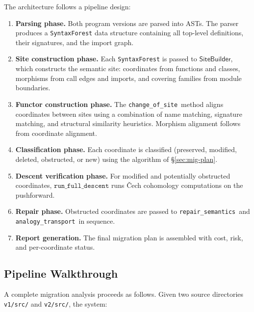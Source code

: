 \documentclass[11pt]{article}
\newcommand{\ChangeOfSite}{\texttt{change\_of\_site}}
\newcommand{\RunDescent}{\texttt{run\_full\_descent}}
\newcommand{\RepairSem}{\texttt{repair\_semantics}}
\newcommand{\AnalTrans}{\texttt{analogy\_transport}}
\begin{document}
The architecture follows a pipeline design:
\begin{enumerate}[noitemsep]
  \item \textbf{Parsing phase.} Both program versions are parsed into ASTs.
        The parser produces a \texttt{SyntaxForest} data structure containing
        all top-level definitions, their signatures, and the import graph.
  \item \textbf{Site construction phase.} Each \texttt{SyntaxForest} is
        passed to $\mathsf{SiteBuilder}$, which constructs the semantic
        site: coordinates from functions and classes, morphisms from call
        edges and imports, and covering families from module boundaries.
  \item \textbf{Functor construction phase.} The \ChangeOfSite\ method
        aligns coordinates between sites using a combination of name
        matching, signature matching, and structural similarity heuristics.
        Morphism alignment follows from coordinate alignment.
  \item \textbf{Classification phase.} Each coordinate is classified
        (preserved, modified, deleted, obstructed, or new) using the
        algorithm of §\ref{sec:mig-plan}.
  \item \textbf{Descent verification phase.} For modified and potentially
        obstructed coordinates, $\RunDescent$ runs \v{C}ech cohomology
        computations on the pushforward.
  \item \textbf{Repair phase.} Obstructed coordinates are passed to
        \RepairSem\ and \AnalTrans\ in sequence.
  \item \textbf{Report generation.} The final migration plan is assembled
        with cost, risk, and per-coordinate status.
\end{enumerate}

\subsection{Pipeline Walkthrough}

A complete migration analysis proceeds as follows.  Given two source
directories \texttt{v1/src/} and \texttt{v2/src/}, the system:
\end{document}
